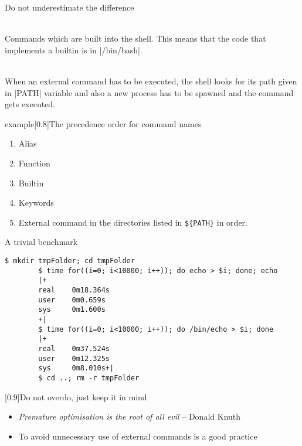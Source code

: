 
\begin{frame}{Do not underestimate the difference}
    \vspace{-3mm}
    \begin{description}[XXX]
        \item[\textbf{Internal Commands:}] ~ \\
            Commands which are built into the shell.
            This means that the code that implements a builtin is in \bash|/bin/bash|.
        \item[\textbf{External Commands:}] ~ \\
            When an external command has to be executed, the shell looks for its path given in \bash|PATH| variable and also a new process has to be spawned and the command gets executed.
    \end{description}
    \begin{varblock}{example}[0.8\textwidth]{The precedence order for command names}
        \begin{enumerate}
            \item Alias
            \item Function 
            \item Builtin  
            \item Keywords
            \item External command in the directories listed in \texttt{\$\{PATH\}} in order.
        \end{enumerate}
    \end{varblock}
\end{frame}
\begin{frame}[fragile]{A trivial benchmark}
    \begin{lstlisting}[style=MyBash]
        $ mkdir tmpFolder; cd tmpFolder
        $ time for((i=0; i<10000; i++)); do echo > $i; done; echo
        |+
        real    0m18.364s
        user    0m0.659s
        sys     0m1.600s
        +|
        $ time for((i=0; i<10000; i++)); do /bin/echo > $i; done
        |+
        real    0m37.524s
        user    0m12.325s
        sys     0m8.010s+|
        $ cd ..; rm -r tmpFolder
    \end{lstlisting}
    \medskip
    \begin{varblock}{}[0.9\textwidth]{Do not overdo, just keep it in mind}
        \begin{itemize}
            \item \emph{\guillemotleft Premature optimisation is the root of all evil\guillemotright} -- Donald Knuth
            \item To avoid unnecessary use of external commands is a good practice
        \end{itemize}
    \end{varblock}
\end{frame}
